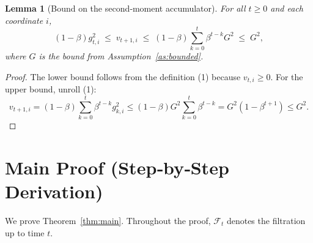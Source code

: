 \documentclass{article}
\newtheorem{lemma}{Lemma}
\begin{document}
\begin{lemma}[Bound on the second‑moment accumulator]\label{lem:vtbound}
For all $t\ge0$ and each coordinate $i$,
\[
(1-\beta)g_{t,i}^{2}\;\le\; v_{t+1,i}\;\le\; (1-\beta)\sum_{k=0}^{t}\beta^{t-k}G^{2}\;\le\; G^{2},
\]
where $G$ is the bound from Assumption~\ref{as:bounded}.
\end{lemma}
\begin{proof}
The lower bound follows from the definition (1) because $v_{t,i}\ge0$.  
For the upper bound, unroll (1):
\[
v_{t+1,i}= (1-\beta)\sum_{k=0}^{t}\beta^{t-k}g_{k,i}^{2}\le (1-\beta)G^{2}\sum_{k=0}^{t}\beta^{t-k}
=G^{2}(1-\beta^{t+1})\le G^{2}.
\]
\end{proof}

\section*{Main Proof (Step‑by‑Step Derivation)}
We prove Theorem~\ref{thm:main}. Throughout the proof, $\mathcal F_{t}$ denotes the filtration up to time $t$.
\end{document}
